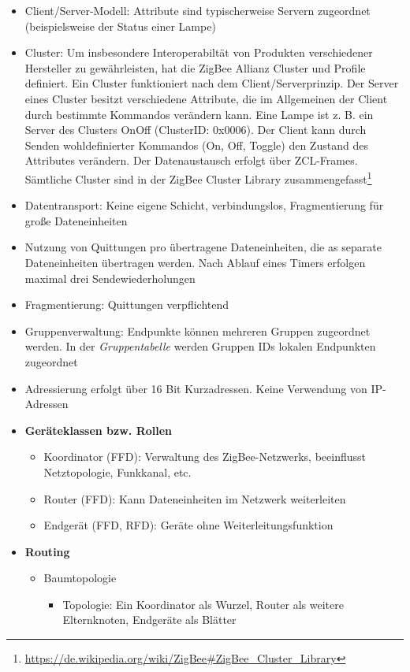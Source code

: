 \begin{itemize}
\begin{itemize}
	\end{itemize}
	\item Client/Server-Modell: Attribute sind typischerweise Servern zugeordnet (beispielsweise der Status einer Lampe)
	\item Cluster: Um insbesondere Interoperabiltät von Produkten verschiedener Hersteller zu gewährleisten, hat die ZigBee Allianz Cluster und Profile definiert. Ein Cluster funktioniert nach dem Client/Serverprinzip. Der Server eines Cluster besitzt verschiedene Attribute, die im Allgemeinen der Client durch bestimmte Kommandos verändern kann. Eine Lampe ist z. B. ein Server des Clusters OnOff (ClusterID: 0x0006). Der Client kann durch Senden wohldefinierter Kommandos (On, Off, Toggle) den Zustand des Attributes verändern. Der Datenaustausch erfolgt über ZCL-Frames. Sämtliche Cluster sind in der ZigBee Cluster Library zusammengefasst\footnote{\url{https://de.wikipedia.org/wiki/ZigBee\#ZigBee_Cluster_Library}}
	\item Datentransport: Keine eigene Schicht, verbindungslos, Fragmentierung für große Dateneinheiten
	\item Nutzung von Quittungen pro übertragene Dateneinheiten, die as separate Dateneinheiten übertragen werden. Nach Ablauf eines Timers erfolgen maximal drei Sendewiederholungen
	\item Fragmentierung: Quittungen verpflichtend
	\item Gruppenverwaltung: Endpunkte können mehreren Gruppen zugeordnet werden. In der \textit{Gruppentabelle} werden Gruppen IDs lokalen Endpunkten zugeordnet
	\item Adressierung erfolgt über 16 Bit Kurzadressen. Keine Verwendung von IP-Adressen
	\item \textbf{Geräteklassen bzw. Rollen}
	\begin{itemize}
		\item Koordinator (FFD): Verwaltung des ZigBee-Netzwerks, beeinflusst Netztopologie, Funkkanal, etc.
		\item Router (FFD): Kann Dateneinheiten im Netzwerk weiterleiten
		\item Endgerät (FFD, RFD): Geräte ohne Weiterleitungsfunktion
	\end{itemize}
	\item \textbf{Routing}
	\begin{itemize}
		\item Baumtopologie
		\begin{itemize}
			\item Topologie: Ein Koordinator als Wurzel, Router als weitere Elternknoten, Endgeräte als Blätter

\end{itemize}
\end{itemize}
\end{itemize}
